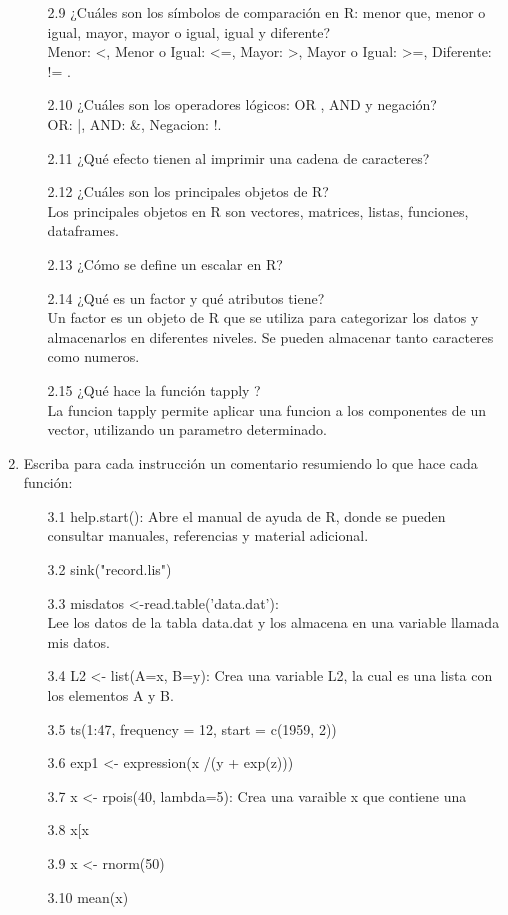 \documentclass[letterpaper, 12pt]{article}
\begin{document}
\begin{enumerate}
\begin{enumerate}
\item[2.9] ¿Cuáles son los símbolos de comparación en R: menor que, menor o 
igual, mayor, mayor o igual, igual y diferente?\\
Menor: <, Menor o Igual: <=, Mayor: >, Mayor o Igual: >=, Diferente: != . 
\item[2.10] ¿Cuáles son los operadores lógicos: OR , AND y negación?\\
OR: |, AND: \&, Negacion: !.
\item[2.11] ¿Qué efecto tienen  al imprimir una cadena de caracteres?
\item[2.12] ¿Cuáles son los principales objetos de R?\\
Los principales objetos en R son vectores, matrices, listas, funciones, 
dataframes.
\item[2.13] ¿Cómo se define un escalar en R?
\item[2.14] ¿Qué es un factor y qué atributos tiene?\\
Un factor es un objeto de R que se utiliza para categorizar los datos y 
almacenarlos en diferentes niveles. Se pueden almacenar tanto caracteres como 
numeros.
\item[2.15] ¿Qué hace la función tapply ?\\
La funcion tapply permite aplicar una funcion a los componentes de un vector, 
utilizando un parametro determinado. 
\end{enumerate}

\item Escriba para cada instrucción un comentario resumiendo lo que hace
cada función:
\begin{enumerate}
\item[3.1] help.start(): Abre el manual de ayuda de R, donde se pueden consultar
manuales, referencias y material adicional.
\item[3.2] sink("record.lis")
\item[3.3] misdatos <-read.table('data.dat'):\\ 
Lee los datos de la tabla data.dat y los almacena en una variable llamada mis 
datos.
\item[3.4] L2 <- list(A=x, B=y): Crea una variable L2, la cual es una lista con 
los elementos A y B.
\item[3.5] ts(1:47, frequency = 12, start = c(1959, 2))
\item[3.6] exp1 <- expression(x /(y + exp(z)))
\item[3.7] x <- rpois(40, lambda=5): Crea una varaible x que contiene una 
\item[3.8] x[x %
\item[3.9] x <- rnorm(50)
\item[3.10] mean(x)
\end{enumerate}


\end{enumerate}
\end{document}
